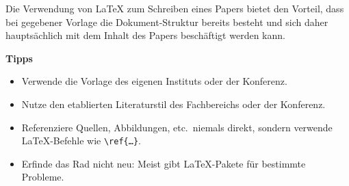 Die Verwendung von \LaTeX{} zum Schreiben eines Papers bietet den Vorteil, dass bei gegebener Vorlage die Dokument-Struktur bereits besteht und sich daher hauptsächlich mit dem Inhalt des Papers beschäftigt werden kann.

\begin{center}
	\textbf{Tipps}
\end{center}
\begin{itemize}
	\item Verwende die Vorlage des eigenen Instituts oder der Konferenz.
	\item Nutze den etablierten Literaturstil des Fachbereichs oder der Konferenz.
	\item Referenziere Quellen, Abbildungen, etc.\ niemals direkt, sondern verwende \LaTeX{}-Befehle wie \texttt{\textbackslash{}ref\{…\}}.
	\item Erfinde das Rad nicht neu: Meist gibt \LaTeX{}-Pakete für bestimmte Probleme.
\end{itemize}
